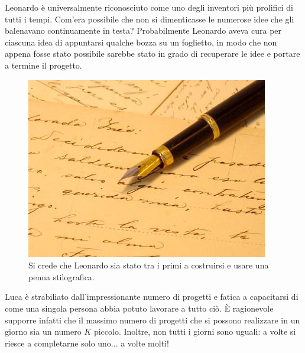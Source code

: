 \usepackage{xcolor}
\usepackage{afterpage}
\usepackage{pifont,mdframed}
\usepackage[bottom]{footmisc}
\usepackage{mathtools}
\usepackage{xfrac}
\usepackage{asymptote}

\DeclarePairedDelimiter\floor{\lfloor}{\rfloor}
\DeclarePairedDelimiter\ceil{\lceil}{\rceil}

\makeatletter
\gdef\this@inputfilename{input}
\gdef\this@outputfilename{output}
\makeatother

\newcommand{\funcitem}[2]{\item[$\blacksquare$] \textbf{\large \textsf{Funzione} \texttt{#1}} \vspace{-0.3cm} \begin{center}\begin{tabularx}{\textwidth}{|c|X|} \hline #2 \hline \end{tabularx}\end{center}}

Leonardo è universalmente riconosciuto come uno degli inventori più prolifici di tutti i tempi. Com'era possibile che non si dimenticasse le numerose idee che gli balenavano continuamente in testa? Probabilmente Leonardo aveva cura per ciascuna idea di appuntarsi qualche bozza su un foglietto, in modo che non appena fosse stato possibile sarebbe stato in grado di recuperare le idee e portare a termine il progetto.

\begin{figure}[H]
  \begin{center}
        \includegraphics[width=0.5\linewidth]{progetti.jpg}
        \caption{Si crede che Leonardo sia stato tra i primi a costruirsi e usare una penna stilografica.}
  \end{center}
\end{figure}

Luca è strabiliato dall'impressionante numero di progetti e fatica a capacitarsi di come una singola persona abbia potuto lavorare a tutto ciò. È ragionevole supporre infatti che il massimo numero di progetti che si possono realizzare in un giorno sia un numero $K$ piccolo. Inoltre, non tutti i giorni sono uguali: a volte si riesce a completarne solo uno... a volte molti!

